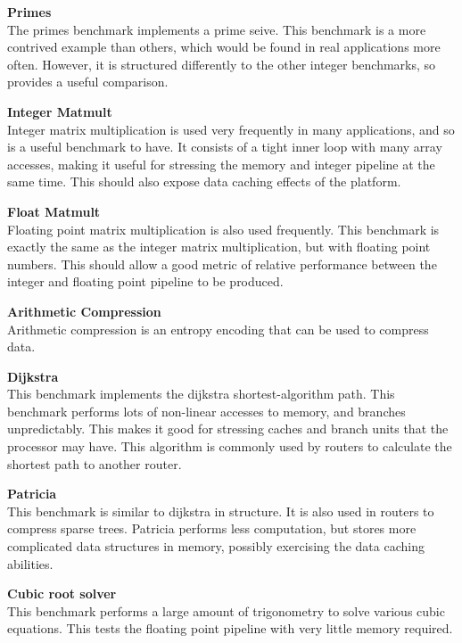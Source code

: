 \documentclass[twocolumn]{article}
\begin{document}
\vspace{3mm}
\textbf{Primes}\\
The primes benchmark implements a prime seive. This benchmark is a more contrived example than others, which would be found in real applications more often. However, it is structured differently to the other integer benchmarks, so provides a useful comparison.

\vspace{3mm}
\textbf{Integer Matmult}\\
Integer matrix multiplication is used very frequently in many applications, and so is a useful benchmark to have. It consists of a tight inner loop with many array accesses, making it useful for stressing the memory and integer pipeline at the same time. This should also expose data caching effects of the platform.

\vspace{3mm}
\textbf{Float Matmult}\\
Floating point matrix multiplication is also used frequently. This benchmark is exactly the same as the integer matrix multiplication, but with floating point numbers. This should allow a good metric of relative performance between the integer and floating point pipeline to be produced.

\vspace{3mm}
\textbf{Arithmetic Compression}\\
Arithmetic compression is an entropy encoding that can be used to compress data.

\vspace{3mm}
\textbf{Dijkstra}\\
This benchmark implements the dijkstra shortest-algorithm path. This benchmark performs lots of non-linear accesses to memory, and branches unpredictably. This makes it good for stressing caches and branch units that the processor may have. This algorithm is commonly used by routers to calculate the shortest path to another router.

\vspace{3mm}
\textbf{Patricia}\\
This benchmark is similar to dijkstra in structure. It is also used in routers to compress sparse trees. Patricia performs less computation, but stores more complicated data structures in memory, possibly exercising the data caching abilities.

\vspace{3mm}
\textbf{Cubic root solver}\\
This benchmark performs a large amount of trigonometry to solve various cubic equations. This tests the floating point pipeline with very little memory required.
\end{document}
